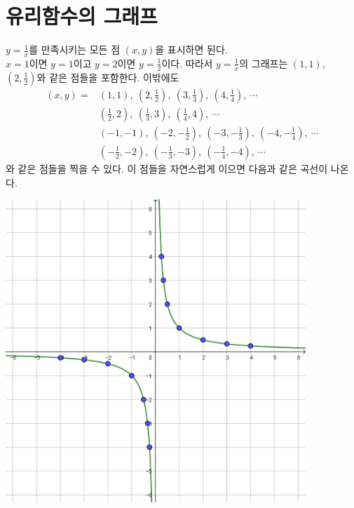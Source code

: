 \documentclass{oblivoir}
\begin{document}
\section{유리함수의 그래프}
%
\begin{mdframed}\label{rational1}
\(y=\frac1x\)를 만족시키는 모든 점 \((x,y)\)을 표시하면 된다.\\
\(x=1\)이면 \(y=1\)이고 \(y=2\)이면 \(y=\frac12\)이다.
따라서 \(y=\frac1x\)의 그래프는 \((1,1)\), \((2,\frac12)\)와 같은 점들을 포함한다.
이밖에도
\begin{align*}
(x,y)
=&\textstyle(1,1),\:(2,\frac12),\:(3,\frac13),\:(4,\frac14),\:\cdots\\
&\textstyle(\frac12,2),\:(\frac13,3),\:(\frac14,4),\:\cdots\\
&\textstyle(-1,-1),\:(-2,-\frac12),\:(-3,-\frac13),\:(-4,-\frac14),\:\cdots\\
&\textstyle(-\frac12,-2),\:(-\frac13,-3),\:(-\frac14,-4),\:\cdots
\end{align*}
와 같은 점들을 찍을 수 있다.
이 점들을 자연스럽게 이으면 다음과 같은 곡선이 나온다.
\begin{center}
\includegraphics[width=0.85\textwidth]{rational_1}
\end{center}
\end{mdframed}
\end{document}
